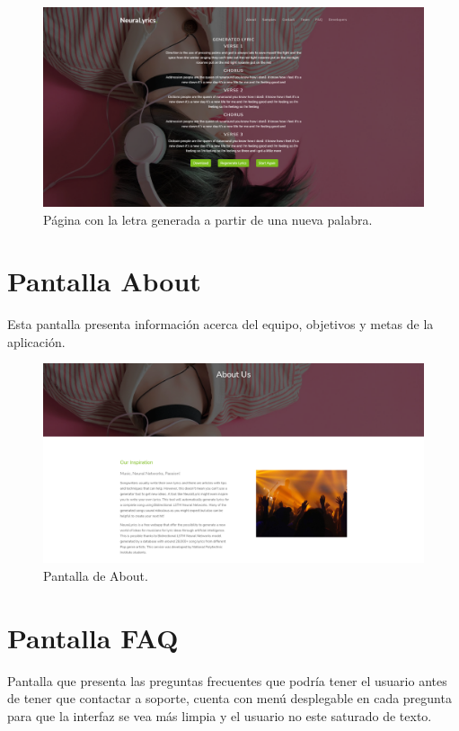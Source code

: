 \documentclass[12pt, a4paper, titlepage]{article}
\begin{document}
\begin{itemize}
		\begin{figure}[H] 
			\includegraphics[width=13.5cm]{./Imagenes/Capturas/StartAgain.png}
			\centering \caption{Página con la letra generada a partir de una nueva palabra.}
		\end{figure}
	
	\end{itemize}	

		\section{Pantalla About}
		Esta pantalla presenta información acerca del equipo, objetivos y metas de la aplicación.
		
		\begin{figure}[H] 
			\includegraphics[width=13.5cm]{./Imagenes/Capturas/pabout.png}
			\centering \caption{Pantalla de About.}
		\end{figure}
	
		\section{Pantalla FAQ}
		Pantalla que presenta las preguntas frecuentes que podría tener el usuario antes de tener que contactar a soporte, cuenta con menú desplegable en cada pregunta para que la interfaz se vea más limpia y el usuario no este saturado de texto.
		
\end{document}
